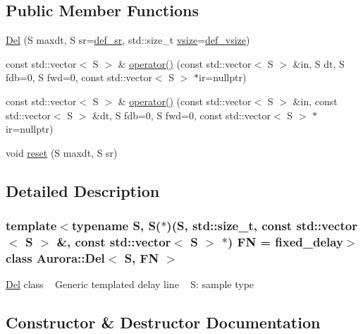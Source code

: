 \subsection*{Public Member Functions}
\begin{DoxyCompactItemize}
\item 
\hyperlink{class_aurora_1_1_del_a06a164e69592f0a9cef68a571b8157d1}{Del} (S maxdt, S sr=\hyperlink{namespace_aurora_ad49263d809bea98dd422e95bc91bc03e}{def\+\_\+sr}, std\+::size\+\_\+t \hyperlink{class_aurora_1_1_snd_base_af9e21aaf411b17f7a8221c991ce5d291}{vsize}=\hyperlink{namespace_aurora_afaaddf667a06e7ce23c667a8b7295263}{def\+\_\+vsize})
\item 
const std\+::vector$<$ S $>$ \& \hyperlink{class_aurora_1_1_del_a6f76f29ff9f2cc2ef1838adac51f6fc5}{operator()} (const std\+::vector$<$ S $>$ \&in, S dt, S fdb=0, S fwd=0, const std\+::vector$<$ S $>$ $\ast$ir=nullptr)
\item 
const std\+::vector$<$ S $>$ \& \hyperlink{class_aurora_1_1_del_aa15df6bc9f86c73725a0fbc91b42ebc2}{operator()} (const std\+::vector$<$ S $>$ \&in, const std\+::vector$<$ S $>$ \&dt, S fdb=0, S fwd=0, const std\+::vector$<$ S $>$ $\ast$ir=nullptr)
\item 
void \hyperlink{class_aurora_1_1_del_adcb695eca560d6ead399a8bbafef9025}{reset} (S maxdt, S sr)
\end{DoxyCompactItemize}


\subsection{Detailed Description}
\subsubsection*{template$<$typename S, S($\ast$)(\+S, std\+::size\+\_\+t, const std\+::vector$<$ S $>$ \&, const std\+::vector$<$ S $>$ $\ast$) FN = fixed\+\_\+delay$>$\newline
class Aurora\+::\+Del$<$ S, F\+N $>$}

\hyperlink{class_aurora_1_1_del}{Del} class ~\newline
Generic templated delay line ~\newline
S\+: sample type 

\subsection{Constructor \& Destructor Documentation}
\mbox{\label{class_aurora_1_1_del_a06a164e69592f0a9cef68a571b8157d1}} 
